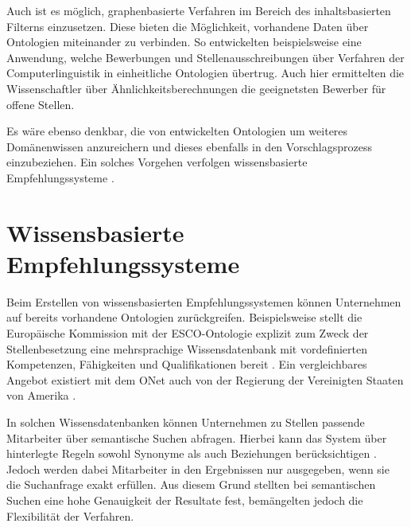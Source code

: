 Auch ist es möglich, graphenbasierte Verfahren im Bereich des inhaltsbasierten Filterns  einzusetzen. Diese bieten die Möglichkeit, vorhandene Daten über Ontologien miteinander zu verbinden. So entwickelten beispielsweise \textcite[S. 1ff.]{kumaran:2013} eine Anwendung, welche Bewerbungen und Stellenausschreibungen über Verfahren der Computerlinguistik in einheitliche Ontologien übertrug. Auch hier ermittelten die Wissenschaftler über Ähnlichkeitsberechnungen die geeignetsten Bewerber für offene Stellen.

Es wäre ebenso denkbar, die von \textcite[S. 1ff.]{kumaran:2013} entwickelten Ontologien um weiteres Domänenwissen anzureichern und dieses ebenfalls in den Vorschlagsprozess einzubeziehen. Ein solches Vorgehen verfolgen wissensbasierte Empfehlungssysteme \cite[S. 168f.]{recommenderSystems:2016}.%

\section{Wissensbasierte Empfehlungssysteme}
\label{ch:empfehlungssysteme:wissensbasierteAnsaetze}
Beim Erstellen von wissensbasierten Empfehlungssystemen können Unternehmen auf bereits vorhandene Ontologien zurückgreifen. Beispielsweise stellt die Europäische Kommission mit der \ac{ESCO}-Ontologie explizit zum Zweck der Stellenbesetzung eine mehrsprachige Wissensdatenbank mit vordefinierten Kompetenzen, Fähigkeiten und Qualifikationen bereit \cite[S. 1ff.]{leVrang:2014}. Ein vergleichbares Angebot existiert mit dem \ac{ONet} auch von der Regierung der Vereinigten Staaten von Amerika \cite[S. 2]{aCombinedRepresentation:2018}.

In solchen Wissensdatenbanken können Unternehmen zu Stellen passende Mitarbeiter über semantische Suchen abfragen. Hierbei kann das System über hinterlegte Regeln sowohl Synonyme als auch Beziehungen berücksichtigen \cite[S. 2f.]{singto:2013}. Jedoch werden dabei Mitarbeiter in den Ergebnissen nur ausgegeben, wenn sie die Suchanfrage exakt erfüllen. Aus diesem Grund stellten \textcite[S. 3]{bianchini:2008} bei semantischen Suchen eine hohe Genauigkeit der Resultate fest, bemängelten jedoch die Flexibilität der Verfahren.

